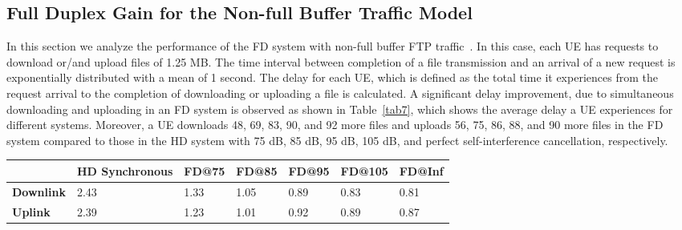 \documentclass[journal]{IEEEtran}
\begin{document}
\subsection{Full Duplex Gain for the Non-full Buffer Traffic Model}\label{sec:NFT}
In this section we analyze the performance of the FD system with non-full buffer FTP traffic~\cite{3GPP:3}. In this case, each UE has requests to download or/and upload files of 1.25 MB. The time interval between completion of a file transmission and an arrival of a new request is exponentially distributed with a mean of 1 second. The delay for each UE, which is defined as the total time it experiences from the request arrival to the completion of downloading or uploading a file is calculated. A significant delay improvement, due to simultaneous downloading and uploading in an FD system is observed as shown in Table~\ref{tab7}, which shows the average delay a UE experiences for different systems. Moreover, a UE downloads 48, 69, 83, 90, and 92 more files and uploads 56, 75, 86, 88, and 90 more files in the FD system compared to those in the HD system with 75 dB, 85 dB, 95 dB, 105 dB, and perfect self-interference cancellation, respectively.

\begin {table*} 
\caption {Average delay (Seconds) in an indoor multi-cell scenario.} \label{tab7} 
\begin{center}
    \begin{tabular}{| l | l | l | l | l | l | l |}
    	\hline
		 & \textbf{HD Synchronous} & \textbf{FD@75} & \textbf{FD@85}  & \textbf{FD@95}  & \textbf{FD@105} & \textbf{FD@Inf} \\ \hline
		\textbf {Downlink} & 2.43 & 1.33 & 1.05 & 0.89 & 0.83 & 0.81 \\ \hline
		\textbf {Uplink}  & 2.39 & 1.23 & 1.01 & 0.92 & 0.89 & 0.87 \\ \hline		
    \end{tabular}
\end{center}
\end{table*}
\end{document}
